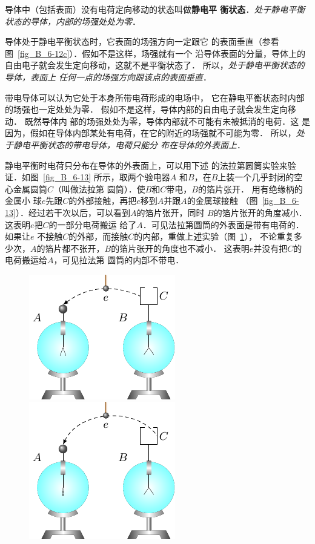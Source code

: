 导体中（包括表面）没有电荷定向移动的状态叫做\textbf{静电平
衡状态}．\textit{处于静电平衡状态的导体，内部的场强处处为零}．

导体处于静电平衡状态时，它表面的场强方向一定跟它
的表面垂直（参看图~\ref{fig_B_6-12c}）．假如不是这样，场强就有一个
沿导体表面的分量，导体上的自由电子就会发生定向移动，这就不是平衡状态了．
所以，\textit{处于静电平衡状态的导体，表面上
任何一点的场强方向跟该点的表面垂直}．

带电导体可以认为它处于本身所带电荷形成的电场中，
它在静电平衡状态时内部的场强也一定处处为零．
假如不是这样，导体内部的自由电子就会发生定向移动．
既然导体内
部的场强处处为零，导体内部就不可能有未被抵消的电荷．这
是因为，假如在导体内部某处有电荷，在它的附近的场强就不可能为零．
所以，\textit{处于静电平衡状态的带电导体，电荷只能分
布在导体的外表面上}．

静电平衡时电荷只分布在导体的外表面上，可以用下述
的法拉第圆筒实验来验证．如图~\ref{fig_B_6-13} 所示，取两个验电器$A$
和$B$，在$B$上装一个几乎封闭的空心金属圆筒$C$（叫做法拉第
圆筒）．使$B$和$C$带电，$B$的箔片张开．
用有绝缘柄的金属小
球$e$先跟$C$的外部接触，再把$e$移到$A$并跟$A$的金属球接触
（图~\ref{fig_B_6-13}）．经过若干次以后，可以看到$A$的箔片张开，同时
$B$的箔片张开的角度减小．这表明$e$把$C$的一部分电荷搬运
给了$A$．可见法拉第圆筒的外表面是带有电荷的．如果让$e$
不接触$C$的外部，而接触$C$的内部，重做上述实验（图~\ref{fig_B_6-14}），
不论重复多少次，$A$的箔片都不张开，$B$的箔片张开的角度也不减小．
这表明$e$并没有把$C$的电荷搬运给$A$，可见拉法第
圆筒的内部不带电．

\begin{figure}[htbp]
    \centering
    \begin{minipage}[t]{0.48\textwidth}
    \centering
    \includegraphics{fig/B/6-13.pdf}
    \caption{}\label{fig_B_6-13}
    \end{minipage}
    \begin{minipage}[t]{0.48\textwidth}
    \centering
    \includegraphics{fig/B/6-14.pdf}
    \caption{}\label{fig_B_6-14}
    \end{minipage}
\end{figure}

